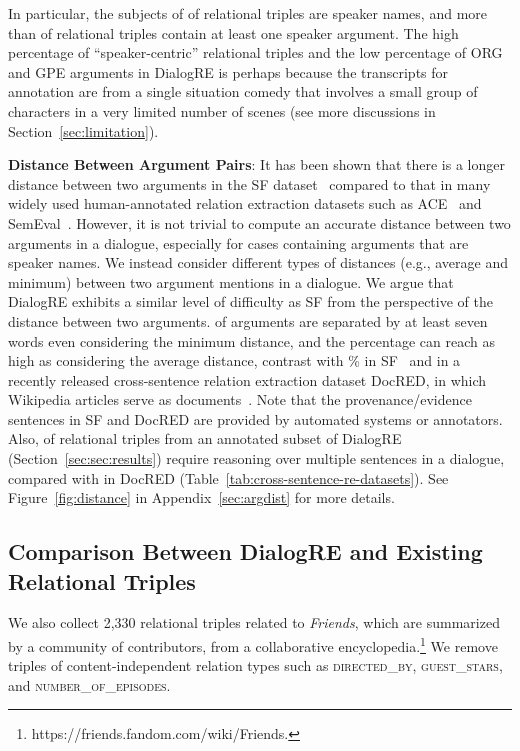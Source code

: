 \documentclass[11pt,a4paper]{article}
\newcommand{\eg}{{e.g.}}
\begin{document}
In particular, the subjects of  of relational triples are speaker names, and more than  of relational triples contain at least one speaker argument. The high percentage of ``speaker-centric'' relational triples and the low percentage of ORG and GPE arguments in DialogRE is perhaps because the transcripts for annotation are from a single situation comedy that involves a small group of characters in a very limited number of scenes (see more discussions in Section~\ref{sec:limitation}).








\medskip
\noindent \textbf{Distance Between Argument Pairs}: It has been shown that there is a longer distance between two arguments in the SF dataset~\cite{surdeanu2013overview,huang-2017-improving} compared to that in many widely used human-annotated relation extraction datasets such as ACE~\cite{doddington2004automatic} and SemEval~\cite{hendrickx2010semeval}. However, it is not trivial to compute an accurate distance between two arguments in a dialogue, especially for cases containing arguments that are speaker names. We instead consider different types of distances (\eg, average and minimum) between two argument mentions in a dialogue. We argue that DialogRE exhibits a similar level of difficulty as SF from the perspective of the distance between two arguments.  of arguments are separated by at least seven words even considering the minimum distance, and the percentage can reach as high as  considering the average distance, contrast with \% in SF~\cite{huang-2017-improving} and  in a recently released cross-sentence relation extraction dataset DocRED, in which Wikipedia articles serve as documents~\cite{yao2019docred}. Note that the provenance/evidence sentences in SF and DocRED are provided by automated systems or annotators. Also,  of relational triples from an annotated subset of DialogRE (Section~\ref{sec:sec:results}) require reasoning over multiple sentences in a dialogue, compared with  in DocRED (Table~\ref{tab:cross-sentence-re-datasets}). See Figure~\ref{fig:distance} in Appendix~\ref{sec:argdist} for more details.






\subsection{Comparison Between DialogRE and Existing Relational Triples}
\label{sec:comparison_with_kb}
We also collect 2,330 relational triples related to \emph{Friends}, which are summarized by a community of contributors, from a collaborative encyclopedia.\footnote{https://friends.fandom.com/wiki/Friends.} We remove triples of content-independent relation types such as \textsc{directed\_by}, \textsc{guest\_stars}, and \textsc{number\_of\_episodes}. 
\end{document}
